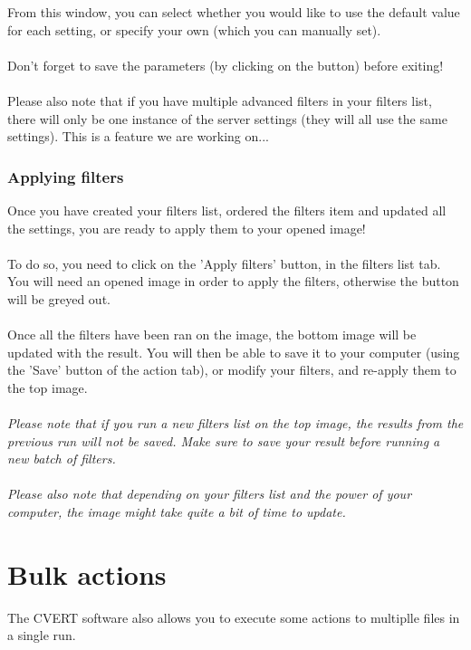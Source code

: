 \documentclass[12pt,a4paper]{article}
\begin{document}
From this window, you can select whether you would like to use the default value for each setting, or specify your own (which you can manually set).\\
~\\
Don't forget to save the parameters (by clicking on the button) before exiting!\\
~\\
Please also note that if you have multiple advanced filters in your filters list, there will only be one instance of the server settings (they will all use the same settings). This is a feature we are working on...

\section{Applying filters}

Once you have created your filters list, ordered the filters item and updated all the settings, you are ready to apply them to your opened image!\\
~\\
To do so, you need to click on the 'Apply filters' button, in the filters list tab. You will need an opened image in order to apply the filters, otherwise the button will be greyed out.\\
~\\
Once all the filters have been ran on the image, the bottom image will be updated with the result. You will then be able to save it to your computer (using the 'Save' button of the action tab), or modify your filters, and re-apply them to the top image.\\
~\\
\textit{Please note that if you run a new filters list on the top image, the results from the previous run will not be saved. Make sure to save your result before running a new batch of filters.}\\
~\\
\textit{Please also note that depending on your filters list and the power of your computer, the image might take quite a bit of time to update.}

\pagebreak

\part{Bulk actions}
\setcounter{section}{0}

The CVERT software also allows you to execute some actions to multiplle files in a single run.
\end{document}
